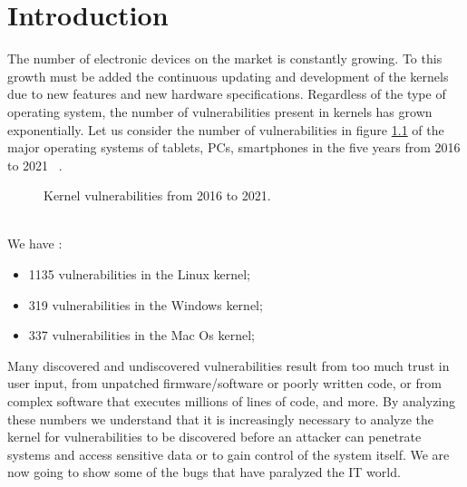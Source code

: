 \documentclass{masterthesis}
\begin{document}
\chapter{Introduction}
\label{ch:intro}
The number of electronic devices on the market is constantly growing.
To this growth must be added the continuous updating and development of the kernels due to new features and new hardware specifications. 
Regardless of the type of operating system, the number of vulnerabilities present in kernels has grown exponentially.
Let us consider the number of vulnerabilities in figure \ref{figure:kernel_vulnerabilities} of the major operating systems of tablets, PCs, smartphones in the five years from 2016 to 2021 ~\cite{cvedatail}.
\begin{figure}[h!]
   \caption{Kernel vulnerabilities from 2016 to 2021.}
   \label{figure:kernel_vulnerabilities}
\end{figure}
\\
We have : 
\begin{itemize}
\item 1135 vulnerabilities in the Linux kernel;
\item 319 vulnerabilities in the Windows kernel;
\item 337 vulnerabilities in the Mac Os kernel;
\end{itemize}
Many discovered and undiscovered vulnerabilities result from too much trust in user input, from unpatched firmware/software or poorly written code, or from complex software that executes millions of lines of code, and more.
By analyzing these numbers we understand that it is increasingly necessary to analyze the kernel for vulnerabilities to be discovered before an attacker can penetrate systems and access sensitive data or to gain control of the system itself.
We are now going to show some of the bugs that have paralyzed the IT world.
\end{document}
